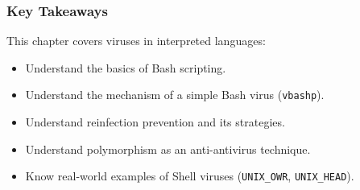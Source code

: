 \documentclass{beamer}
\begin{document}
\begin{frame}
  \frametitle{Key Takeaways}
  This chapter covers viruses in interpreted languages:
  \begin{itemize}
  \item Understand the basics of Bash scripting.
  \item Understand the mechanism of a simple Bash virus (\texttt{vbashp}).
  \item Understand reinfection prevention and its strategies.
  \item Understand polymorphism as an anti-antivirus technique.
  \item Know real-world examples of Shell viruses (\texttt{UNIX\_OWR}, \texttt{UNIX\_HEAD}).
  \end{itemize}
\end{frame}
\end{document}
